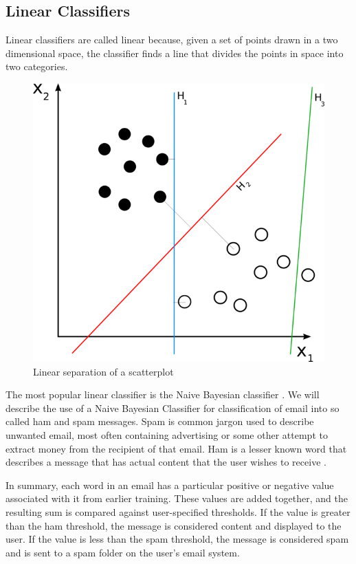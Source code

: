 \documentclass[12pt]{article}
\begin{document}
\subsection{Linear Classifiers}
Linear classifiers are called linear because, given a set of points drawn in a two dimensional space, the
classifier finds a line that divides the points in space into two categories.\\
\begin{figure}[center]
  \centering
\includegraphics[scale=.4,natwidth=720,natheight=540]{svm_separating_hyperplanes.png}  
  \caption{Linear separation of a scatterplot}
\end{figure}

The most popular linear classifier is the Naive Bayesian classifier \citep{kononenko1991semi}.
We will describe the use of a Naive Bayesian Classifier for classification of email into so called ham and
spam messages. Spam is common jargon used to describe unwanted email, most often containing advertising or
some other attempt to extract money from the recipient of that email. Ham is a lesser known word that
describes a message that has actual content that the user wishes to receive \citep{nelson2008exploiting}.


In summary, each word in an email has a particular positive or negative value associated with it from earlier
training. These values are added together, and the resulting sum is compared against user-specified
thresholds. If the value is greater than the ham threshold, the message is considered content and displayed to
the user. If the value is less than the spam threshold, the message is considered spam and is sent to a spam
folder on the user's email system.
\end{document}
